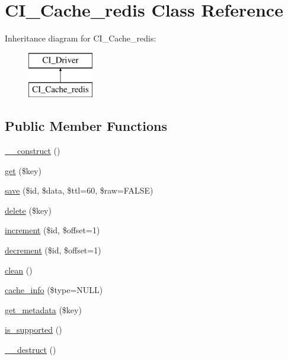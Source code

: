\hypertarget{class_c_i___cache__redis}{}\section{C\+I\+\_\+\+Cache\+\_\+redis Class Reference}
\label{class_c_i___cache__redis}
Inheritance diagram for C\+I\+\_\+\+Cache\+\_\+redis\+:\begin{figure}[H]
\begin{center}
\leavevmode
\includegraphics[height=2.000000cm]{class_c_i___cache__redis}
\end{center}
\end{figure}
\subsection*{Public Member Functions}
\begin{DoxyCompactItemize}
\item 
\mbox{\hyperlink{class_c_i___cache__redis_a9731da89feb6738ea4e80720a580ffae}{\+\_\+\+\_\+construct}} ()
\item 
\mbox{\hyperlink{class_c_i___cache__redis_a08a32036825fbf6d5b54e40ad58bd751}{get}} (\$key)
\item 
\mbox{\hyperlink{class_c_i___cache__redis_adba0ef17819ebdf225fef9b1857cc56e}{save}} (\$id, \$data, \$ttl=60, \$raw=F\+A\+L\+SE)
\item 
\mbox{\hyperlink{class_c_i___cache__redis_acd59add8ac722e73226b596abc8b52f0}{delete}} (\$key)
\item 
\mbox{\hyperlink{class_c_i___cache__redis_ac3ead3bec93a06fff90cf4068ff0bf8c}{increment}} (\$id, \$offset=1)
\item 
\mbox{\hyperlink{class_c_i___cache__redis_a99c79630faef219ec87e52d821a8d149}{decrement}} (\$id, \$offset=1)
\item 
\mbox{\hyperlink{class_c_i___cache__redis_a19c82fbc3b7146eca92cbe27e42f8227}{clean}} ()
\item 
\mbox{\hyperlink{class_c_i___cache__redis_ab5f3eae8eb8c0362bfc0397889ca025c}{cache\+\_\+info}} (\$type=N\+U\+LL)
\item 
\mbox{\hyperlink{class_c_i___cache__redis_abf71c98c96df2cf2f0ad68a9ae434bc3}{get\+\_\+metadata}} (\$key)
\item 
\mbox{\hyperlink{class_c_i___cache__redis_a61e605c749e5d6ace082bb6d263e8186}{is\+\_\+supported}} ()
\item 
\mbox{\hyperlink{class_c_i___cache__redis_a57c0ac5fd134c45c31e7b81d5d16c92d}{\+\_\+\+\_\+destruct}} ()
\end{DoxyCompactItemize}
